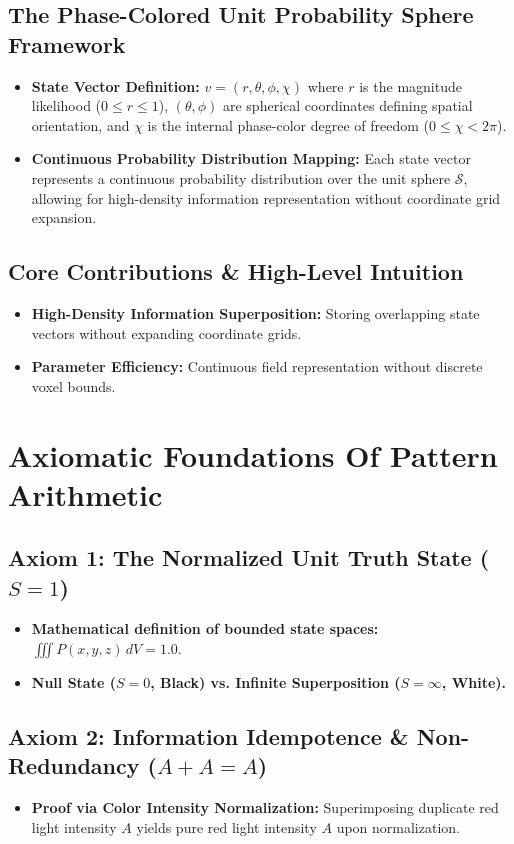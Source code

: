 \documentclass[12pt, a4paper]{article}
\begin{document}
\subsection{The Phase-Colored Unit Probability Sphere Framework}
\begin{itemize}
    \item \textbf{State Vector Definition:} $v = (r, \theta, \phi, \chi)$ where $r$ is the magnitude likelihood ($0 \leq r \leq 1$), $(\theta, \phi)$ are spherical coordinates defining spatial orientation, and $\chi$ is the internal phase-color degree of freedom ($0 \leq \chi < 2\pi$).
    \item \textbf{Continuous Probability Distribution Mapping:} Each state vector represents a continuous probability distribution over the unit sphere $\mathcal{S}$, allowing for high-density information representation without coordinate grid expansion.
\end{itemize}

\subsection{Core Contributions \& High-Level Intuition}
\begin{itemize}
    \item \textbf{High-Density Information Superposition:} Storing overlapping state vectors without expanding coordinate grids.
    \item \textbf{Parameter Efficiency:} Continuous field representation without discrete voxel bounds.
\end{itemize}

\section{Axiomatic Foundations Of Pattern Arithmetic}

\subsection{Axiom 1: The Normalized Unit Truth State ($S = 1$)}
\begin{itemize}
    \item \textbf{Mathematical definition of bounded state spaces:} $\iiint P(x,y,z) \, dV = 1.0$.
    \item \textbf{Null State ($S = 0$, Black) vs. Infinite Superposition ($S = \infty$, White).}   
\end{itemize}

\subsection{Axiom 2: Information Idempotence \& Non-Redundancy ($A + A = A$)}
\begin{itemize}
    \item \textbf{Proof via Color Intensity Normalization:} Superimposing duplicate red light intensity $A$ yields pure red light intensity $A$ upon normalization.
\end{itemize}
\end{document}
